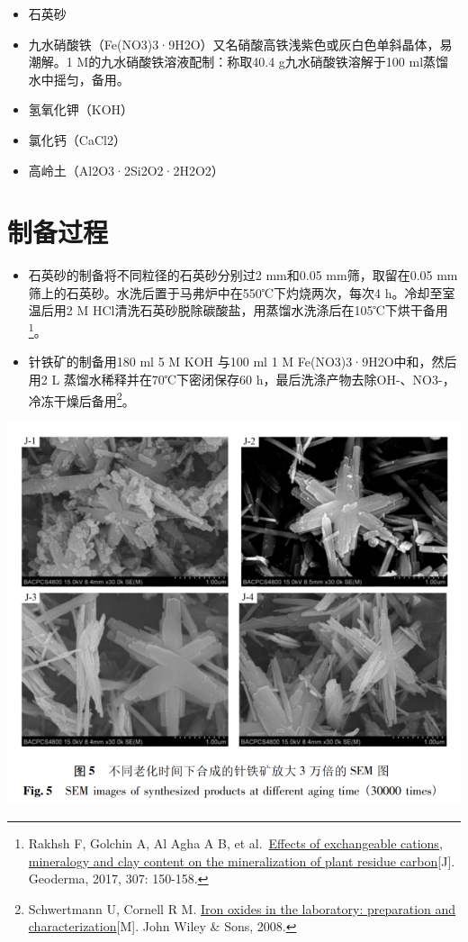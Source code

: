 \documentclass[
  letterpaper,
  DIV=11,
  numbers=noendperiod]{scrartcl}
\begin{document}
\begin{itemize}
\item
  石英砂
\item
  九水硝酸铁（Fe(NO3)3·9H2O）又名硝酸高铁浅紫色或灰白色单斜晶体，易潮解。1
  M的九水硝酸铁溶液配制：称取40.4 g九水硝酸铁溶解于100
  ml蒸馏水中摇匀，备用。
\item
  氢氧化钾（KOH）
\item
  氯化钙（CaCl2）
\item
  高岭土（Al2O3·2Si2O2·2H2O2）
\end{itemize}

\hypertarget{ux5236ux5907ux8fc7ux7a0b}{%
\section{制备过程}\label{ux5236ux5907ux8fc7ux7a0b}}

\begin{itemize}
\item
  石英砂的制备将不同粒径的石英砂分别过2 mm和0.05 mm筛，取留在0.05
  mm筛上的石英砂。水洗后置于马弗炉中在550℃下灼烧两次，每次4
  h。冷却至室温后用2 M
  HCl清洗石英砂脱除碳酸盐，用蒸馏水洗涤后在105℃下烘干备用\footnote{Rakhsh
    F, Golchin A, Al Agha A B, et
    al.~\href{https://doi.org/10.1016/j.geoderma.2017.07.010}{Effects of
    exchangeable cations, mineralogy and clay content on the
    mineralization of plant residue carbon}{[}J{]}. Geoderma, 2017, 307:
    150-158.}。
\item
  针铁矿的制备用180 ml 5 M KOH 与100 ml 1 M Fe(NO3)3·9H2O中和，然后用2 L
  蒸馏水稀释并在70℃下密闭保存60
  h，最后洗涤产物去除OH-、NO3-，冷冻干燥后备用\footnote{Schwertmann U,
    Cornell R M.
    \href{https://doi.org/10.1180/claymin.1992.027.3.14}{Iron oxides in
    the laboratory: preparation and characterization}{[}M{]}. John Wiley
    \& Sons, 2008.}。
\end{itemize}

\includegraphics{针铁矿的制备.png}
\end{document}

